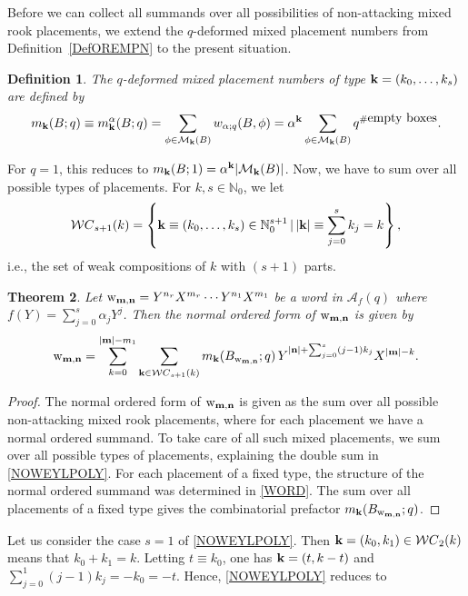 \documentclass[10pt]{amsart}
\newtheorem{theorem}{Theorem}[section]%
\newtheorem{definition}[theorem]{Definition}
\begin{document}
Before we can collect all summands over all possibilities of non-attacking mixed rook placements, we extend the $q$-deformed mixed placement numbers from Definition~\ref{DefOREMPN} to the present situation. 
\begin{definition}\label{DefMPN}
The {\em $q$-deformed mixed placement numbers of type ${\bf k}=(k_0,\ldots,k_s)$} are defined by 
\begin{equation}
m_{{\bf k}}(B;q)\equiv m_{{\bf k}}^{\bf  \alpha}(B;q)=\sum_{\phi \in {\mathcal M}_{{\bf k}}(B)} w_{{\bf \alpha};q}(B,\phi)=  {\bf  \alpha}^{{\bf k}} \sum_{\phi \in {\mathcal M}_{{\bf k}}(B)} q^{\# \mbox{empty boxes}}.
\end{equation}
\end{definition}
For $q=1$, this reduces to $m_{{\bf k}}(B;1)={\bf  \alpha}^{{\bf k}}|{\mathcal M}_{{\bf k}}(B)|$. 
Now, we have to sum over all possible types of placements. For $k,s\in \mathbb{N}_0$, we let
$$
{\mathcal WC}_{s+1}(k)=\left\{{\bf k} \equiv (k_0,\ldots,k_s) \in \mathbb{N}_0^{s+1} \, | \, |{\bf k} | \equiv \sum_{j=0}^s k_j = k \right\},
$$
i.e., the set of weak compositions of $k$ with $(s+1)$ parts. 
\begin{theorem}\label{THNOWEYLPOLY} Let $\mathrm{w}_{{\bf m}, {\bf n}}=Y^{n_r}X^{m_r}\cdots Y^{n_1}X^{m_1}$ be a word in ${\mathcal A}_f(q)$ where $f(Y)=\sum_{j=0}^s \alpha_jY^j$. Then the normal ordered form of $\mathrm{w}_{{\bf m}, {\bf n}}$ is given by
\begin{equation}\label{NOWEYLPOLY}
\mathrm{w}_{{\bf m}, {\bf n}}=\sum_{k=0}^{|{\bf m}|-m_1} \sum_{{\bf k} \in {\mathcal WC}_{s+1}(k)} m_{{\bf k}}(B_{\mathrm{w}_{{\bf m}, {\bf n}}};q) \, Y^{|{\bf n}|+\sum_{j=0}^s (j-1)k_j} X^{|{\bf m}|- k}.
\end{equation}
\end{theorem}
\begin{proof}
The normal ordered form of $\mathrm{w}_{{\bf m}, {\bf n}}$ is given as the sum over all possible non-attacking mixed rook placements, where for each placement we have a normal ordered summand. To take care of all such mixed placements, we sum over all possible types of placements, explaining the double sum in \eqref{NOWEYLPOLY}. For each placement of a fixed type, the structure of the normal ordered summand was determined in \eqref{WORD}. The sum over all placements of a fixed type gives the combinatorial prefactor $m_{{\bf k}}(B_{\mathrm{w}_{{\bf m}, {\bf n}}};q) $. 
\end{proof}
Let us consider the case $s=1$ of \eqref{NOWEYLPOLY}. Then ${\bf k}=(k_0,k_1) \in {\mathcal WC}_{2}(k)$ means that $k_0+k_1=k$. Letting $t \equiv k_0$, one has ${\bf k}=(t,k-t)$ and $\sum_{j=0}^1(j-1)k_j=-k_0=-t$. Hence, \eqref{NOWEYLPOLY} reduces to
\end{document}
